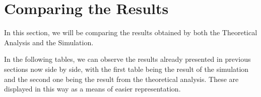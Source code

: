 \clearpage

\section{Comparing the Results}
\label{sec:comparing}

In this section, we will be comparing the results obtained by both the Theoretical Analysis and the Simulation.

In the following tables, we can observe the results already presented in previous sections now side by side, with the first table being the result of the simulation and the second one being the result from the theoretical analysis. These are displayed in this
way as a means of easier representation.

